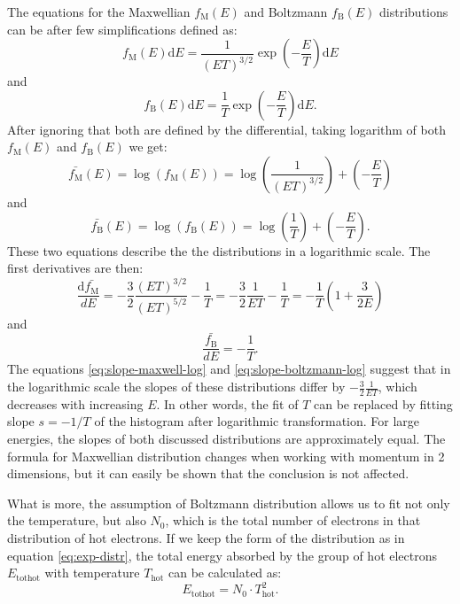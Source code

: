 The equations for the Maxwellian $f_\mathrm{M}(E)$ and Boltzmann $f_\mathrm{B}(E)$ distributions can be after few simplifications defined as:
\begin{equation}
	f_\mathrm{M}(E)\mathrm{d}E = \frac{1}{(ET)^{3/2}}\exp\left(-\frac{E}{T}\right)\mathrm{d}E
\end{equation}
and
\begin{equation}
	f_\mathrm{B}(E)\mathrm{d}E = \frac{1}{T}\exp\left(-\frac{E}{T}\right)\mathrm{d}E.
\end{equation}
After ignoring that both are defined by the differential, taking logarithm of both $f_\mathrm{M}(E)$ and $f_\mathrm{B}(E)$ we get:
\begin{equation}
	\bar{f_\mathrm{M}}(E) = \log\left(f_\mathrm{M}(E)\right) = \log\left(\frac{1}{(ET)^{3/2}}\right)+\left(-\frac{E}{T}\right)
\end{equation}
and
\begin{equation}
	\bar{f_\mathrm{B}}(E) = \log\left(f_\mathrm{B}(E)\right) = \log\left(\frac{1}{T}\right)+\left(-\frac{E}{T}\right).
\end{equation}
These two equations describe the the distributions in a logarithmic scale. The first derivatives are then:
\begin{equation}
	\label{eq:slope-maxwell-log}
	\frac{\mathrm{d}\bar{f_\mathrm{M}}}{dE} =-\frac{3}{2}\frac{(ET)^{3/2}}{(ET)^{5/2}}-\frac{1}{T} = -\frac{3}{2}\frac{1}{ET}-\frac{1}{T} = -\frac{1}{T}\left(1+\frac{3}{2E}\right)
\end{equation}
and
\begin{equation}
	\label{eq:slope-boltzmann-log}
	\frac{\bar{f_\mathrm{B}}}{dE} = -\frac{1}{T}.
\end{equation}
The equations \ref{eq:slope-maxwell-log} and \ref{eq:slope-boltzmann-log} suggest that in the logarithmic scale the slopes of these distributions differ by $-\frac{3}{2}\frac{1}{ET}$, which decreases with increasing $E$. In other words, the fit of $T$ can be replaced by fitting slope $s = -1/T$ of the histogram after logarithmic transformation. For large energies, the slopes of both discussed distributions are approximately equal. The formula for Maxwellian distribution changes when working with momentum in 2 dimensions, but it can easily be shown that the conclusion is not affected.

What is more, the assumption of Boltzmann distribution allows us to fit not only the temperature, but also $N_0$, which is the total number of electrons in that distribution of hot electrons. If we keep the form of the distribution as in equation \ref{eq:exp-distr}, the total energy absorbed by the group of hot electrons $E_{\mathrm{tothot}}$ with temperature $T_\mathrm{hot}$ can be calculated as:
\begin{equation}
	E_{\mathrm{tothot}} = N_0\cdot T_\mathrm{hot}^2.
\end{equation}
